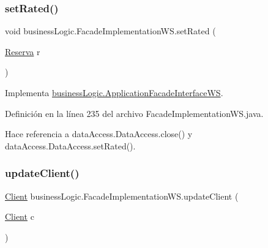 \mbox{\label{classbusiness_logic_1_1_facade_implementation_w_s_a4ed81cb9f24d501da830d80dda086fce}} 
\subsubsection{\texorpdfstring{setRated()}{setRated()}}
{\footnotesize\ttfamily void business\+Logic.\+Facade\+Implementation\+W\+S.\+set\+Rated (\begin{DoxyParamCaption}\item[{\mbox{\hyperlink{classdomain_1_1_reserva}{Reserva}}}]{r }\end{DoxyParamCaption})}



Implementa \mbox{\hyperlink{interfacebusiness_logic_1_1_application_facade_interface_w_s_a0092e0a845b7b23dc504be013ce1958a}{business\+Logic.\+Application\+Facade\+Interface\+WS}}.



Definición en la línea 235 del archivo Facade\+Implementation\+W\+S.\+java.


\begin{DoxyCode}{0}

\end{DoxyCode}


Hace referencia a data\+Access.\+Data\+Access.\+close() y data\+Access.\+Data\+Access.\+set\+Rated().

\mbox{\label{classbusiness_logic_1_1_facade_implementation_w_s_a5918c2957b02255254ae252aabfe3fc1}} 
\subsubsection{\texorpdfstring{updateClient()}{updateClient()}}
{\footnotesize\ttfamily \mbox{\hyperlink{classdomain_1_1_client}{Client}} business\+Logic.\+Facade\+Implementation\+W\+S.\+update\+Client (\begin{DoxyParamCaption}\item[{\mbox{\hyperlink{classdomain_1_1_client}{Client}}}]{c }\end{DoxyParamCaption})}



